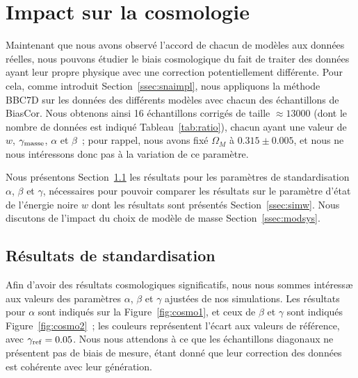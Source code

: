 \documentclass[../main/main.tex]{subfiles}
\begin{document}
\section{Impact sur la cosmologie}\label{sec:simres}

Maintenant que nous avons observé l'accord de chacun de modèles aux données
réelles, nous pouvons étudier le biais cosmologique du fait de traiter des
données ayant leur propre physique avec une correction potentiellement
différente. Pour cela, comme introduit Section~\ref{ssec:snaimpl}, nous
appliquons la méthode BBC7D \citep[][voir Chapitre~\ref{ch:snana}
Section~\ref{ssec:bbc7D}]{popovic2021a} sur les données des différents modèles
avec chacun des échantillons de BiasCor. Nous obtenons ainsi 16 échantillons
corrigés de taille $\approx \num{13000}$ (dont le nombre de données est indiqué
Tableau~\ref{tab:ratio}), chacun ayant une valeur de $w$, $\gamma_{\rm masse}$,
$\alpha$ et $\beta$~; pour rappel, nous avons fixé $\Omega_M$ à
$\num{0.315}\pm\num{0.005}$, et nous ne nous intéressons donc pas à la variation
de ce paramètre.

Nous présentons Section~\ref{ssec:simabg} les résultats pour les paramètres de
standardisation $\alpha$, $\beta$ et $\gamma$, nécessaires pour pouvoir comparer
les résultats sur le paramètre d'état de l'énergie noire $w$ dont les résultats
sont présentés Section~\ref{ssec:simw}. Nous discutons de l'impact du choix de
modèle de masse Section~\ref{ssec:modsys}.

\subsection{Résultats de standardisation}\label{ssec:simabg}

Afin d'avoir des résultats cosmologiques significatifs, nous nous sommes
intéressæ aux valeurs des paramètres $\alpha$, $\beta$ et $\gamma$ ajustées de
nos simulations.  Les résultats pour $\alpha$ sont indiqués sur la
Figure~\ref{fig:cosmo1}, et ceux de $\beta$ et $\gamma$ sont indiqués
Figure~\ref{fig:cosmo2}~; les couleurs représentent l'écart aux valeurs de
référence, avec $\gamma_{\rm ref} = \num{0.05}$. Nous nous attendons à ce que
les échantillons diagonaux ne présentent pas de biais de mesure, étant donné que
leur correction des données est cohérente avec leur génération.
\end{document}

